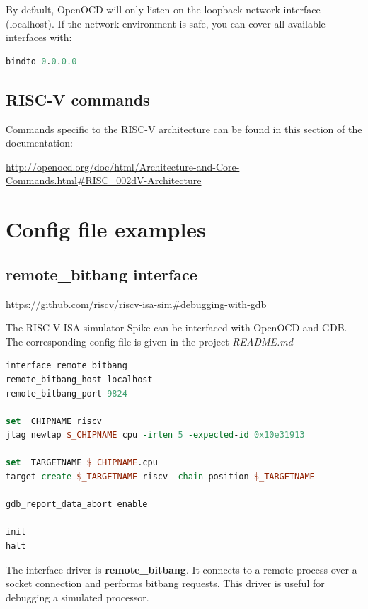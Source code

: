 \documentclass{article}
\begin{document}
    By default, OpenOCD will only listen on the loopback network interface (localhost). If the network environment is safe, you can cover all available interfaces with:
    
    \begin{lstlisting}[language=tcl]
    bindto 0.0.0.0
    \end{lstlisting}
    
    \subsection{RISC-V commands}
    
    Commands specific to the RISC-V architecture can be found in this section of the documentation: 
    
    \url{http://openocd.org/doc/html/Architecture-and-Core-Commands.html#RISC_002dV-Architecture}
    
    \newpage
    \section{Config file examples}
    
    \subsection{remote\_bitbang interface}
    
    \url{https://github.com/riscv/riscv-isa-sim#debugging-with-gdb}
    
    The RISC-V ISA simulator Spike can be interfaced with OpenOCD and GDB. The corresponding config file is given in the project \textit{README.md}
    
    \begin{lstlisting}[language=tcl]
interface remote_bitbang
remote_bitbang_host localhost
remote_bitbang_port 9824

set _CHIPNAME riscv
jtag newtap $_CHIPNAME cpu -irlen 5 -expected-id 0x10e31913

set _TARGETNAME $_CHIPNAME.cpu
target create $_TARGETNAME riscv -chain-position $_TARGETNAME

gdb_report_data_abort enable

init
halt
    \end{lstlisting}
    
    The interface driver is \textbf{remote\_bitbang}. It connects to a remote process over a socket connection and performs bitbang requests. This driver is useful for debugging a simulated processor.
    
\end{document}
